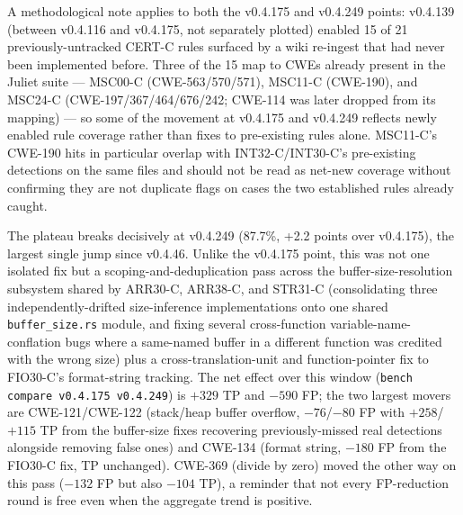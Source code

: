 A methodological note applies to both the v0.4.175 and v0.4.249
points: v0.4.139 (between v0.4.116 and v0.4.175, not separately
plotted) enabled 15 of 21 previously-untracked CERT-C rules
surfaced by a wiki re-ingest that had never been implemented before.
Three of the 15 map to CWEs already present in the Juliet suite ---
MSC00-C (CWE-563/570/571), MSC11-C (CWE-190), and MSC24-C
(CWE-197/367/464/676/242; CWE-114 was later dropped from its mapping)
--- so some of the movement at v0.4.175 and v0.4.249 reflects newly
enabled rule coverage rather than fixes to pre-existing rules alone.
MSC11-C's CWE-190 hits in particular overlap with INT32-C/INT30-C's
pre-existing detections on the same files and should not be read as
net-new coverage without confirming they are not duplicate flags on
cases the two established rules already caught.

The plateau breaks decisively at v0.4.249 (87.7\%, +2.2 points over
v0.4.175), the largest single jump since v0.4.46. Unlike the v0.4.175
point, this was not one isolated fix but a scoping-and-deduplication
pass across the buffer-size-resolution subsystem shared by ARR30-C,
ARR38-C, and STR31-C (consolidating three independently-drifted
size-inference implementations onto one shared \texttt{buffer\_size.rs}
module, and fixing several cross-function variable-name-conflation
bugs where a same-named buffer in a different function was credited
with the wrong size) plus a cross-translation-unit and
function-pointer fix to FIO30-C's format-string tracking. The net
effect over this window (\texttt{bench compare v0.4.175 v0.4.249}) is
$+329$ TP and $-590$ FP; the two largest movers are CWE-121/CWE-122
(stack/heap buffer overflow, $-76$/$-80$ FP with $+258$/$+115$ TP from
the buffer-size fixes recovering previously-missed real detections
alongside removing false ones) and CWE-134 (format string, $-180$ FP
from the FIO30-C fix, TP unchanged). CWE-369 (divide by zero) moved
the other way on this pass ($-132$ FP but also $-104$ TP), a reminder
that not every FP-reduction round is free even when the aggregate
trend is positive.

